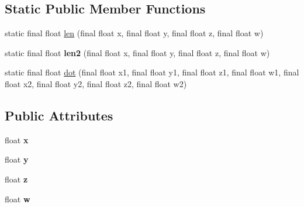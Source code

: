 \subsection*{Static Public Member Functions}
\begin{DoxyCompactItemize}
\item 
static final float \hyperlink{classairhockeyjava_1_1util_1_1_quaternion_a8305d53d62da44e744fb34b19d74984e}{len} (final float x, final float y, final float z, final float w)
\item 
\hypertarget{classairhockeyjava_1_1util_1_1_quaternion_af9aab0d3e540b86cf9e8be52e72a0ff8}{}static final float {\bfseries len2} (final float x, final float y, final float z, final float w)\label{classairhockeyjava_1_1util_1_1_quaternion_af9aab0d3e540b86cf9e8be52e72a0ff8}

\item 
static final float \hyperlink{classairhockeyjava_1_1util_1_1_quaternion_a7d43acaef5261a79078b7d6ea2af0264}{dot} (final float x1, final float y1, final float z1, final float w1, final float x2, final float y2, final float z2, final float w2)
\end{DoxyCompactItemize}
\subsection*{Public Attributes}
\begin{DoxyCompactItemize}
\item 
\hypertarget{classairhockeyjava_1_1util_1_1_quaternion_a3ff689f6f7cb9de78db9fc39c86daca4}{}float {\bfseries x}\label{classairhockeyjava_1_1util_1_1_quaternion_a3ff689f6f7cb9de78db9fc39c86daca4}

\item 
\hypertarget{classairhockeyjava_1_1util_1_1_quaternion_a0d26d4458e4dace6c6abef5176caa468}{}float {\bfseries y}\label{classairhockeyjava_1_1util_1_1_quaternion_a0d26d4458e4dace6c6abef5176caa468}

\item 
\hypertarget{classairhockeyjava_1_1util_1_1_quaternion_a70e136b8f4cc99dad7d4a1a5cdd6139a}{}float {\bfseries z}\label{classairhockeyjava_1_1util_1_1_quaternion_a70e136b8f4cc99dad7d4a1a5cdd6139a}

\item 
\hypertarget{classairhockeyjava_1_1util_1_1_quaternion_abf381e87cb7159c15af2fb0a531652c2}{}float {\bfseries w}\label{classairhockeyjava_1_1util_1_1_quaternion_abf381e87cb7159c15af2fb0a531652c2}

\end{DoxyCompactItemize}


